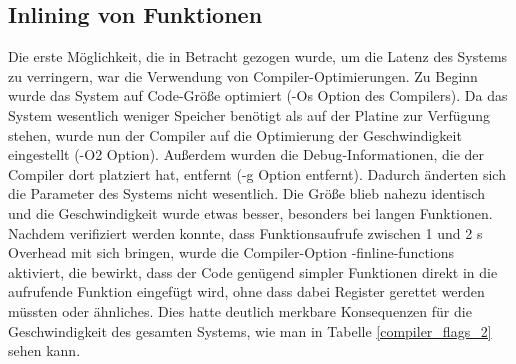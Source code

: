 \subsection{Inlining von Funktionen}
Die erste Möglichkeit, die in Betracht gezogen wurde, um die Latenz des Systems zu verringern, war die Verwendung von
Compiler-Optimierungen. Zu Beginn wurde das System auf Code-Größe optimiert (-Os Option des Compilers). Da das System
wesentlich weniger Speicher benötigt als auf der Platine zur Verfügung stehen, wurde
nun der Compiler auf die Optimierung der Geschwindigkeit eingestellt (-O2 Option). Außerdem wurden die Debug-Informationen,
die der Compiler dort platziert hat, entfernt (-g Option entfernt). Dadurch änderten sich die Parameter des Systems nicht
wesentlich. Die Größe blieb nahezu identisch und die Geschwindigkeit wurde etwas besser, besonders bei langen Funktionen.\\
Nachdem verifiziert werden konnte, dass Funktionsaufrufe zwischen 1 und 2 \textmu{}s Overhead mit sich bringen, wurde
die Compiler-Option -finline-functions aktiviert, die bewirkt, dass der Code genügend simpler Funktionen direkt in die aufrufende
Funktion eingefügt wird, ohne dass dabei Register gerettet werden müssten oder ähnliches. Dies hatte deutlich merkbare
Konsequenzen für die Geschwindigkeit des gesamten Systems, wie man in Tabelle \ref{compiler_flags_2} sehen kann.

